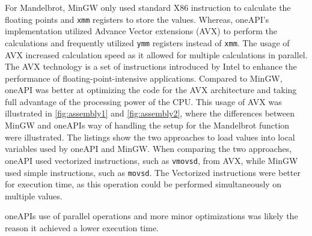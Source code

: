For Mandelbrot, MinGW only used standard X86 instruction\cite{X86} to calculate the floating points and \texttt{xmm} registers to store the values. Whereas, oneAPI's implementation utilized Advance Vector extensions (AVX)\cite{AVXIntel} to perform the calculations and frequently utilized \texttt{ymm} registers instead of \texttt{xmm}. The usage of AVX increased calculation speed as it allowed for multiple calculations in parallel. The AVX technology is a set of instructions introduced by Intel to enhance the performance of floating-point-intensive applications\cite{AVXIntel}. Compared to MinGW, oneAPI was better at optimizing the code for the AVX architecture and taking full advantage of the processing power of the CPU. This usage of AVX was illustrated in \cref{fig:assembly1} and \cref{fig:assembly2}, where the differences between MinGW and oneAPIs way of handling the setup for the Mandelbrot function were illustrated. The listings show the two approaches to load values into local variables used by oneAPI and MinGW. When comparing the two approaches, oneAPI used vectorized instructions, such as \texttt{vmovsd}, from AVX, while MinGW used simple instructions, such as \texttt{movsd}. The Vectorized instructions were better for execution time, as this operation could be performed simultaneously on multiple values.

oneAPIs use of parallel operations and more minor optimizations was likely the reason it achieved a lower execution time.%










